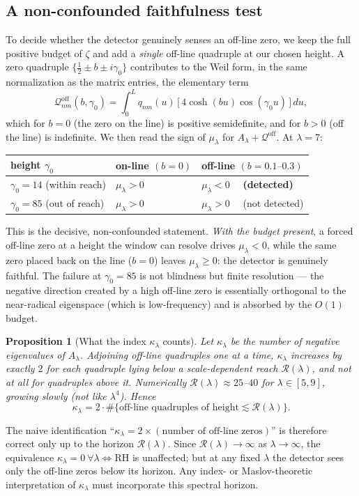 \documentclass[11pt]{amsart}
\newtheorem{proposition}[theorem]{Proposition}
\theoremstyle{definition}
\theoremstyle{remark}
\newcommand{\lam}{\lambda}
\begin{document}
\subsection{A non-confounded faithfulness test}\label{sec:nonconfound}
To decide whether the detector genuinely senses an off-line zero, we keep the full positive budget of $\zeta$ and add a \emph{single} off-line quadruple at our chosen height. A zero quadruple $\{\tfrac12\pm b\pm i\gamma_0\}$ contributes to the Weil form, in the same normalization as the matrix entries, the elementary term
\[
\mathcal Q^{\mathrm{off}}_{nm}(b,\gamma_0)=\int_0^L q_{nm}(u)\,\bigl[\,4\cosh(bu)\cos(\gamma_0 u)\,\bigr]\,du,
\]
which for $b=0$ (the zero on the line) is positive semidefinite, and for $b>0$ (off the line) is indefinite. We then read the sign of $\mu_\lam$ for $A_\lam+\mathcal Q^{\mathrm{off}}$. At $\lam=7$:
\begin{center}
\begin{tabular}{lll}
\toprule
height $\gamma_0$ & on-line $(b=0)$ & off-line $(b=0.1\text{--}0.3)$\\
\midrule
$\gamma_0=14$ (within reach) & $\mu_\lam>0$ & $\mu_\lam<0$ \ \ \textbf{(detected)}\\
$\gamma_0=85$ (out of reach) & $\mu_\lam>0$ & $\mu_\lam>0$ \ \ (not detected)\\
\bottomrule
\end{tabular}
\end{center}
This is the decisive, non-confounded statement. \emph{With the budget present}, a forced off-line zero at a height the window can resolve drives $\mu_\lam<0$, while the same zero placed back on the line ($b=0$) leaves $\mu_\lam\ge0$: the detector is genuinely faithful. The failure at $\gamma_0=85$ is not blindness but finite resolution --- the negative direction created by a high off-line zero is essentially orthogonal to the near-radical eigenspace (which is low-frequency) and is absorbed by the $O(1)$ budget.

\begin{proposition}[What the index $\kappa_\lam$ counts]\label{prop:kappacount}
Let $\kappa_\lam$ be the number of negative eigenvalues of $A_\lam$. Adjoining off-line quadruples one at a time, $\kappa_\lam$ increases by exactly $2$ for each quadruple lying below a scale-dependent \emph{reach} $\mathcal R(\lam)$, and not at all for quadruples above it. Numerically $\mathcal R(\lam)\approx 25$--$40$ for $\lam\in[5,9]$, growing slowly (not like $\lam^4$). Hence
\[
\kappa_\lam = 2\cdot\#\{\text{off-line quadruples of height}\lesssim \mathcal R(\lam)\}.
\]
\end{proposition}
The naive identification ``$\kappa_\lam=2\times(\text{number of off-line zeros})$'' is therefore correct only up to the horizon $\mathcal R(\lam)$. Since $\mathcal R(\lam)\to\infty$ as $\lam\to\infty$, the equivalence $\kappa_\lam=0\ \forall\lam\Leftrightarrow\text{RH}$ is unaffected; but at any fixed $\lam$ the detector sees only the off-line zeros below its horizon. Any index- or Maslov-theoretic interpretation of $\kappa_\lam$ must incorporate this spectral horizon.
\end{document}
